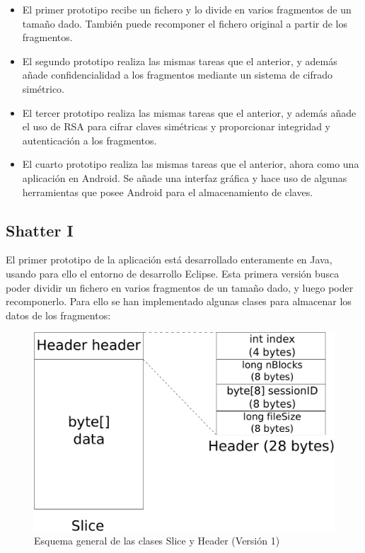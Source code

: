 \begin{itemize}
  \item El primer prototipo recibe un fichero y lo divide en varios fragmentos
  de un tamaño dado. También puede recomponer el fichero original a partir de
  los fragmentos.

  \item El segundo prototipo realiza las mismas tareas que el anterior, y además
  añade confidencialidad a los fragmentos mediante un sistema de cifrado
  simétrico.

  \item El tercer prototipo realiza las mismas tareas que el anterior, y además
  añade el uso de RSA para cifrar claves simétricas y proporcionar integridad y
  autenticación a los fragmentos.

  \item El cuarto prototipo realiza las mismas tareas que el anterior, ahora
  como una aplicación en Android. Se añade una interfaz gráfica y hace uso de
  algunas herramientas que posee Android para el almacenamiento de claves.
\end{itemize}

\subsection{Shatter I}

El primer prototipo de la aplicación está desarrollado enteramente en Java,
usando para ello el entorno de desarrollo Eclipse. Esta primera versión busca
poder dividir un fichero en varios fragmentos de un tamaño dado, y luego poder
recomponerlo. Para ello se han implementado algunas clases para almacenar los
datos de los fragmentos:

\begin{figure}[ht]
  \centering
  \includegraphics[scale=0.4]{Figures/Slice_Header_1}
  \decoRule
  \caption[Slice - Header (Versión 1)]{Esquema general de las clases Slice y Header (Versión 1)}
  \label{fig:Slice_Header_1}
\end{figure}


